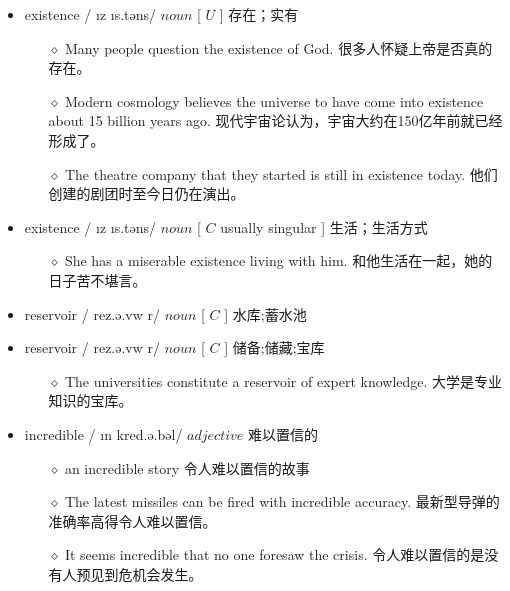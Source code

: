 \documentclass[a4paper,top=2.5cm,buttom=2.5cm10.5pt]{book}
\begin{document}
\begin{itemize}
\item existence / \i  \textscriptg  \textprimstress z \i s.təns/ $ noun $ [  $ U $  ] 存在；实有
\begin{itemize}
\item[$\diamond$] Many people question the existence of God.
很多人怀疑上帝是否真的存在。
\item[$\diamond$] Modern cosmology believes the universe to have come into existence about 15 billion years ago.
现代宇宙论认为，宇宙大约在150亿年前就已经形成了。
\item[$\diamond$] The theatre company that they started is still in existence today.
他们创建的剧团时至今日仍在演出。
\end{itemize}
\end{itemize}
\begin{itemize}
\item existence / \i  \textscriptg  \textprimstress z \i s.təns/ $ noun $ [  $ C $  usually singular ] 生活；生活方式
\begin{itemize}
\item[$\diamond$] She has a miserable existence living with him.
和他生活在一起，她的日子苦不堪言。
\end{itemize}
\end{itemize}
\begin{itemize}
\item reservoir / \textprimstress rez.ə.vw \textscripta  \textlengthmark r/ $ noun $ [  $ C $  ] 水库;蓄水池
\end{itemize}
\begin{itemize}
\item reservoir / \textprimstress rez.ə.vw \textscripta  \textlengthmark r/ $ noun $ [  $ C $  ] 储备;储藏;宝库
\begin{itemize}
\item[$\diamond$] The universities constitute a reservoir of expert knowledge.
大学是专业知识的宝库。
\end{itemize}
\end{itemize}
\begin{itemize}
\item incredible / \i n \textprimstress kred.ə.bəl/ $ adjective $  难以置信的
\begin{itemize}
\item[$\diamond$] an incredible story
令人难以置信的故事
\item[$\diamond$] The latest missiles can be fired with incredible accuracy.
最新型导弹的准确率高得令人难以置信。
\item[$\diamond$] It seems incredible that no one foresaw the crisis.
令人难以置信的是没有人预见到危机会发生。
\end{itemize}
\end{itemize}
\end{document}
